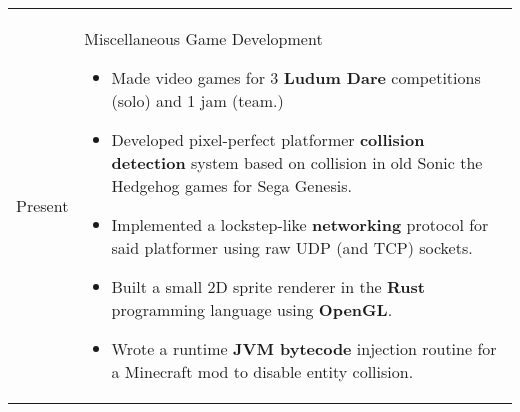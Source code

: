 \documentclass[11pt]{article}
\newenvironment{timeline}
        {\begin{tabular}{p{21 mm}|p{150 mm}}}
        {\end{tabular}}
\newenvironment{timelinetitle}
        {\vspace{-2 mm}\begin{large}}
        {\end{large}\vspace{-1.5 mm}}
\newcommand{\timespan}[2]{{#2}\newline{#1}}
\begin{document}
\begin{timeline}
\timespan{2011}{Present}
&
\begin{timelinetitle}
    Miscellaneous Game Development
\end{timelinetitle}
\begin{itemize}
  \item Made video games for 3 \textbf{Ludum Dare} competitions (solo) and 1 jam (team.)

  \item Developed pixel-perfect platformer \textbf{collision detection} system based on collision in old Sonic the Hedgehog games for Sega Genesis.

  \item Implemented a lockstep-like \textbf{networking} protocol for said platformer using raw UDP (and TCP) sockets.

  \item Built a small 2D sprite renderer in the \textbf{Rust} programming language using \textbf{OpenGL}.

  \item Wrote a runtime \textbf{JVM bytecode} injection routine for a Minecraft mod to disable entity collision.
\end{itemize}

\end{timeline}
\end{document}
